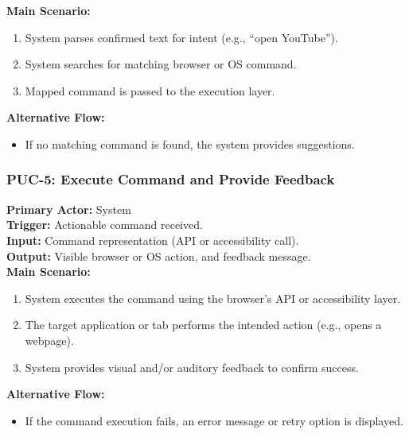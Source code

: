 \documentclass[11pt]{article}
\begin{document}
\textbf{Main Scenario:}
\begin{enumerate}
  \item System parses confirmed text for intent (e.g., “open YouTube”).
  \item System searches for matching browser or OS command.
  \item Mapped command is passed to the execution layer.
\end{enumerate}

\textbf{Alternative Flow:}
\begin{itemize}
  \item If no matching command is found, the system provides suggestions.
\end{itemize}

\bigskip

\subsubsection*{PUC-5: Execute Command and Provide Feedback}
\textbf{Primary Actor:} System \\
\textbf{Trigger:} Actionable command received. \\
\textbf{Input:} Command representation (API or accessibility call). \\
\textbf{Output:} Visible browser or OS action, and feedback message. \\

\textbf{Main Scenario:}
\begin{enumerate}
  \item System executes the command using the browser’s API or accessibility layer.
  \item The target application or tab performs the intended action (e.g., opens a webpage).
  \item System provides visual and/or auditory feedback to confirm success.
\end{enumerate}

\textbf{Alternative Flow:}
\begin{itemize}
  \item If the command execution fails, an error message or retry option is displayed.
\end{itemize}

\bigskip
\end{document}
